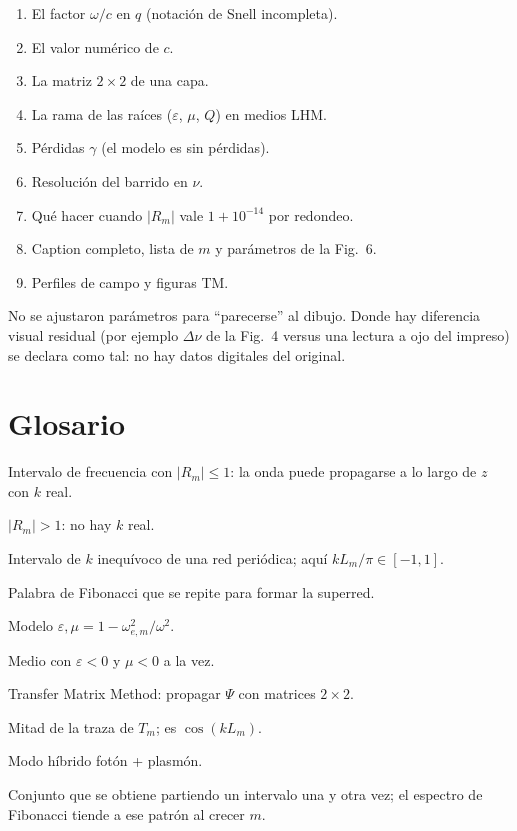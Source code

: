 \documentclass[11pt,a4paper]{article}
\begin{document}
\begin{enumerate}
\item El factor \(\omega/c\) en \(q\) (notación de Snell incompleta).
\item El valor numérico de \(c\).
\item La matriz \(2\times 2\) de una capa.
\item La rama de las raíces (\(\varepsilon\), \(\mu\), \(Q\)) en medios LHM.
\item Pérdidas \(\gamma\) (el modelo es sin pérdidas).
\item Resolución del barrido en \(\nu\).
\item Qué hacer cuando \(\lvert R_m\rvert\) vale \(1+10^{-14}\) por redondeo.
\item Caption completo, lista de \(m\) y parámetros de la Fig.\ 6.
\item Perfiles de campo y figuras TM.
\end{enumerate}

No se ajustaron parámetros para ``parecerse'' al dibujo. Donde hay diferencia
visual residual (por ejemplo \(\Delta\nu\) de la Fig.\ 4 versus una lectura a
ojo del impreso) se declara como tal: no hay datos digitales del original.

\section{Glosario}

\begin{description}[style=nextline,leftmargin=1.4cm]
\item[Banda] Intervalo de frecuencia con \(\lvert R_m\rvert\le 1\): la onda
puede propagarse a lo largo de \(z\) con \(k\) real.
\item[Gap (hueco)] \(\lvert R_m\rvert>1\): no hay \(k\) real.
\item[Zona de Brillouin] Intervalo de \(k\) inequívoco de una red periódica;
aquí \(k L_m/\pi\in[-1,1]\).
\item[Celda \(S_m\)] Palabra de Fibonacci que se repite para formar la
superred.
\item[Drude] Modelo \(\varepsilon,\mu=1-\omega_{e,m}^2/\omega^2\).
\item[LHM] Medio con \(\varepsilon<0\) y \(\mu<0\) a la vez.
\item[TMM] Transfer Matrix Method: propagar \(\Psi\) con matrices \(2\times 2\).
\item[Semitraza \(R_m\)] Mitad de la traza de \(T_m\); es \(\cos(k L_m)\).
\item[Polaritón] Modo híbrido fotón + plasmón.
\item[Cantor] Conjunto que se obtiene partiendo un intervalo una y otra vez;
el espectro de Fibonacci tiende a ese patrón al crecer \(m\).
\end{description}
\end{document}
